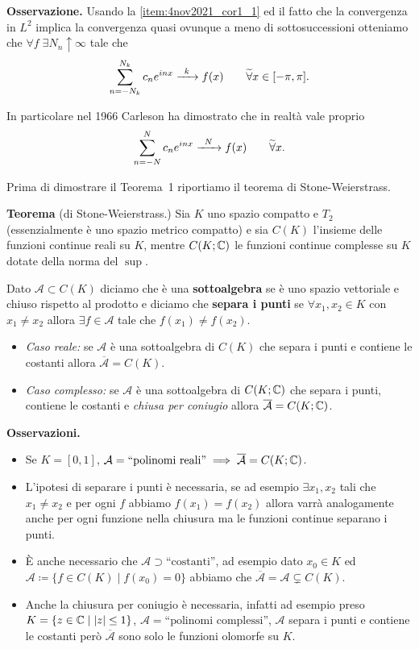 \textbf{Osservazione.}
Usando la \ref{item:4nov2021_cor1_1} ed il fatto che la convergenza in $L^2$ implica la convergenza quasi ovunque a meno di sottosuccessioni otteniamo che $\forall f \; \exists N_n \uparrow \infty$ tale che
$$
	\sum_{n = -N_k}^{N_k} c_n e^{inx} \xrightarrow{\;\;k\;\;} f(x) \qquad \widetilde\forall x \in [-\pi, \pi].
$$

In particolare nel 1966 Carleson ha dimostrato che in realtà vale proprio
$$
	\sum_{n = -N}^N c_n e^{inx} \xrightarrow{\;\;N\;\;} f(x) \qquad \widetilde\forall x.
$$

Prima di dimostrare il Teorema~1 riportiamo il teorema di Stone-Weierstrass.

\textbf{Teorema} (di Stone-Weierstrass.)
Sia $K$ uno spazio compatto e $T_2$ (essenzialmente è uno spazio metrico compatto) e sia $C(K)$ l'insieme delle funzioni continue reali su $K$, mentre $C(K; \mathbb C)$ le funzioni continue complesse su $K$ dotate della norma del $\sup$.

Dato $\mathcal A \subset C(K)$ diciamo che è una \textbf{sottoalgebra} se è uno spazio vettoriale e chiuso rispetto al prodotto e diciamo che \textbf{separa i punti} se $\forall x_1, x_2 \in K$ con $x_1 \neq x_2$ allora $\exists f \in \mathcal A$ tale che $f(x_1) \neq f(x_2)$.
\begin{itemize}
	\item \textit{Caso reale:}
	se $\mathcal A$ è una sottoalgebra di $C(K)$ che separa i punti e contiene le costanti allora $\overline{\mathcal A} = C(K)$.
	
	\item \textit{Caso complesso:}
	se $\mathcal A$ è una sottoalgebra di $C(K; \mathbb C)$ che separa i punti, contiene le costanti e \textit{chiusa per coniugio} allora $\overline{\mathcal A} = C(K; \mathbb C)$.
	
\end{itemize}

\textbf{Osservazioni.}
\begin{itemize}
	\item Se $K = [0, 1]$, $\mathcal A = \text{``polinomi reali''} \implies \overline{\mathcal A} = C(K; \mathbb C)$.
	
	\item L'ipotesi di separare i punti è necessaria, se ad esempio $\exists x_1, x_2$ tali che $x_1 \neq x_2$ e per ogni $f$ abbiamo $f(x_1) = f(x_2)$ allora varrà analogamente anche per ogni funzione nella chiusura ma le funzioni continue separano i punti.

	\item È anche necessario che $\mathcal A \supset \text{``costanti''}$, ad esempio dato $x_0 \in K$ ed $\mathcal A \coloneqq \{ f \in C(K) \mid f(x_0) = 0 \}$ abbiamo che $\overline{\mathcal A} = \mathcal A \subsetneq C(K)$.

	\item Anche la chiusura per coniugio è necessaria, infatti ad esempio preso $K = \{ z \in \mathbb C \mid |z| \leq 1 \}$, $\mathcal A = \text{``polinomi complessi''}$, $\mathcal A$ separa i punti e contiene le costanti però $\overline{\mathcal A}$ sono solo le funzioni olomorfe su $K$.
\end{itemize}


